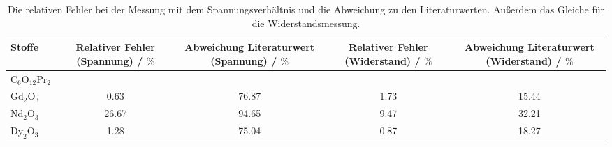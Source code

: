 \begin{table}\caption{Die relativen Fehler bei der Messung mit dem Spannungsverhältnis und die Abweichung zu den Literaturwerten. Außerdem das Gleiche für die Widerstandsmessung.}
\label{taberr}
\centering
{}
\begin{tabular}{l S S S S} 
\toprule
{Stoffe} & {Relativer Fehler (Spannung) / $\si{\percent}$} & {Abweichung Literaturwert (Spannung) / $\si{\percent}$} & {Relativer Fehler (Widerstand) / $\si{\percent}$} & {Abweichung Literaturwert (Widerstand) / $\si{\percent}$} \\
\midrule
$\text{C}_6 \text{O}_{12} \text{Pr}_2$  &  &  &  &  \\
$\text{Gd}_2 \text{O}_3$                & 0.63 & 76.87 & 1.73 & 15.44 \\
$\text{Nd}_2 \text{O}_3$                & 26.67 & 94.65 & 9.47 & 32.21 \\
$\text{Dy}_2 \text{O}_3$                & 1.28 & 75.04 & 0.87 & 18.27 \\
\bottomrule
\end{tabular}\end{table}
